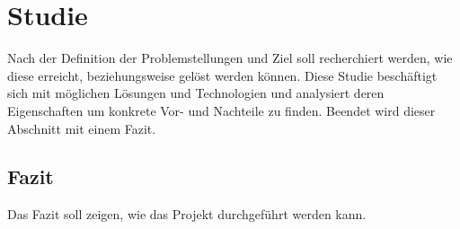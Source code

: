 \chapter{Studie}
Nach der Definition der Problemstellungen und Ziel soll recherchiert werden, wie diese erreicht, beziehungsweise gelöst werden können. Diese Studie beschäftigt sich mit möglichen Lösungen und Technologien und analysiert deren Eigenschaften um konkrete Vor- und Nachteile zu finden.
Beendet wird dieser Abschnitt mit einem Fazit.

\section{Fazit}
Das Fazit soll zeigen, wie das Projekt durchgeführt werden kann.